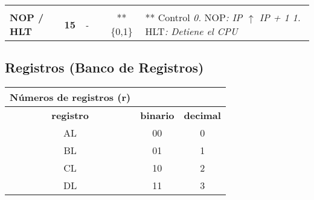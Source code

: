 \documentclass[12pt,twoside]{templates/unerthesis}
\begin{document}
\begin{longtable}[]{@{}lccccl@{}}
\begin{minipage}[t]{0.14\columnwidth}\raggedright
\strut
\end{minipage} & \begin{minipage}[t]{0.14\columnwidth}\centering
\strut
\end{minipage} & \begin{minipage}[t]{0.14\columnwidth}\centering
\strut
\end{minipage} & \begin{minipage}[t]{0.14\columnwidth}\centering
\strut
\end{minipage} & \begin{minipage}[t]{0.14\columnwidth}\centering
\strut
\end{minipage} & \begin{minipage}[t]{0.14\columnwidth}\raggedright
\strut
\end{minipage}\tabularnewline
\begin{minipage}[t]{0.14\columnwidth}\raggedright
\textbf{NOP / HLT}\strut
\end{minipage} & \begin{minipage}[t]{0.14\columnwidth}\centering
\textbf{15}\strut
\end{minipage} & \begin{minipage}[t]{0.14\columnwidth}\centering
\emph{-}\strut
\end{minipage} & \begin{minipage}[t]{0.14\columnwidth}\centering
\strut
\end{minipage} & \begin{minipage}[t]{0.14\columnwidth}\centering
**\{0,1\}\strut
\end{minipage} & \begin{minipage}[t]{0.14\columnwidth}\raggedright
** Control \emph{0.} NOP\emph{: IP \(\uparrow\) IP + 1 1.} HLT\emph{: Detiene el CPU}\strut
\end{minipage}\tabularnewline
\bottomrule
\end{longtable}

\hypertarget{registros-banco-de-registros}{%
\subsection{Registros (Banco de Registros)}\label{registros-banco-de-registros}}

\begin{longtable}[]{@{}ccc@{}}
\toprule
Números de registros (r) & &\tabularnewline
\midrule
\endhead
\textbf{registro} & \textbf{binario} & \textbf{decimal}\tabularnewline
AL & 00 & 0\tabularnewline
BL & 01 & 1\tabularnewline
CL & 10 & 2\tabularnewline
DL & 11 & 3\tabularnewline
\bottomrule
\end{longtable}
\end{document}
